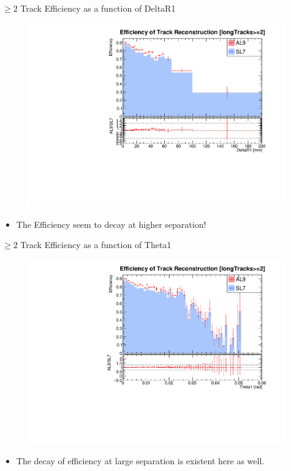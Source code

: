 \begin{frame}{$\geq2$ Track Efficiency as a function of DeltaR1}
    \begin{figure}
        \includegraphics[width=0.8\linewidth]{./output/Effi_greq2_DeltaR1_unzoom.pdf}
    \end{figure}
    \begin{itemize}
        \item The Efficiency seem to decay at higher separation!
    \end{itemize}
\end{frame}

\begin{frame}{$\geq2$ Track Efficiency as a function of Theta1}
    \begin{figure}
        \includegraphics[width=0.8\linewidth]{./output/Effi_greq2_Theta1.pdf}
    \end{figure}
    \begin{itemize}
        \item The decay of efficiency at large separation is existent here as well.
    \end{itemize}
\end{frame}

